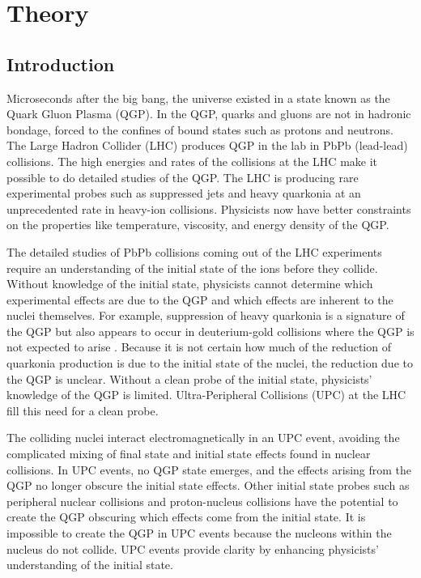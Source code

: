 \chapter{Theory}
  \section{Introduction}
    Microseconds after the big bang, the universe existed in a state known as
      the Quark Gluon Plasma (QGP).
    In the QGP, quarks and gluons are not in hadronic bondage, forced to 
      the confines of bound states such as protons and neutrons.
    The Large Hadron Collider (LHC) produces QGP in the lab in PbPb (lead-lead)
      collisions.
    The high energies and rates of the collisions at the LHC make it possible 
      to do detailed studies of the QGP. 
    The LHC is producing rare experimental probes such as suppressed jets and 
      heavy quarkonia at an unprecedented rate in heavy-ion collisions. 
    Physicists now have better constraints on the properties like temperature,
      viscosity, and energy density of the QGP. 
    
    The detailed studies of PbPb collisions coming out of the LHC 
      experiments require an understanding of the initial state of the ions 
      before they collide.
    Without knowledge of the initial state, physicists cannot determine which
      experimental effects are due to the QGP and which effects are inherent to
      the nuclei themselves. 
    For example, suppression of heavy quarkonia is a signature of the QGP 
      but also appears to occur in deuterium-gold collisions where the QGP is not
      expected to arise \cite{dAuOniaPHENIX}. 
    Because it is not certain how much of the reduction of quarkonia production
      is due to the initial state of the nuclei, the reduction due to the QGP
      is unclear. 
    Without a clean probe of the initial state, physicists' knowledge of the 
      QGP is limited.
    Ultra-Peripheral Collisions (UPC) at the LHC fill this need for a clean 
      probe. 

    The colliding nuclei interact electromagnetically in an UPC event, avoiding
      the complicated mixing of final state and initial state effects found 
      in nuclear collisions.
    In UPC events, no QGP state emerges, and the effects arising from the QGP 
      no longer obscure the initial state effects.
    Other initial state probes such as peripheral nuclear collisions and 
      proton-nucleus collisions have the potential to create the QGP obscuring 
      which effects come from the initial state.
    It is impossible to create the QGP in UPC events because the nucleons 
      within the nucleus do not collide. 
    UPC events provide clarity by enhancing physicists' 
      understanding of the initial state. 
    
